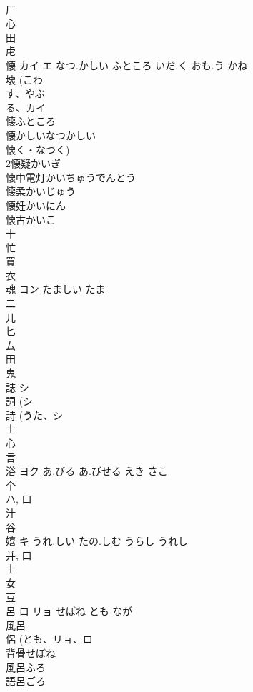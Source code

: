 \documentclass[8pt]{extreport}
\begin{document}
\begin{CJK}{UTF8}{min}
\\	厂 
\\	心 
\\	田 
\\	虍 
\\	懐	カイ エ	なつ.かしい ふところ いだ.く おも.う かね	
\\	壊 (こわ
\\	す、やぶ
\\	る、カイ 
\\	懐ふところ
\\	懐かしいなつかしい
\\	懐く・なつく) 
\\	2懐疑かいぎ
\\	懐中電灯かいちゅうでんとう
\\	懐柔かいじゅう
\\	懐妊かいにん
\\	懐古かいこ
\\	十 
\\	忙 
\\	買 
\\	衣 
\\	魂	コン	たましい たま	
\\	二 
\\	儿 
\\	匕 
\\	厶 
\\	田 
\\	鬼 
\\	誌	シ		
\\	詞 (シ 
\\	詩 (うた、シ 
\\	士 
\\	心 
\\	言 
\\	浴	ヨク	あ.びる あ.びせる えき さこ	
\\	个 
\\	ハ, 口 
\\	汁 
\\	谷 
\\	嬉	キ	うれ.しい たの.しむ うらし うれし	
\\	并, 口 
\\	士 
\\	女 
\\	豆 
\\	呂	ロ リョ	せぼね とも なが	
\\	風呂 
\\	侶 (とも、リョ、ロ 
\\	背骨せぼね
\\	風呂ふろ
\\	語呂ごろ

\end{CJK}
\end{document}
